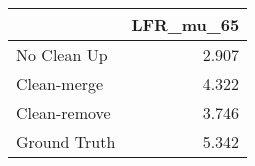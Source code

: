 \begin{tabular}{lr}
\toprule
{} & LFR_mu_65 \\
\midrule
No Clean Up  &     2.907 \\
Clean-merge  &     4.322 \\
Clean-remove &     3.746 \\
Ground Truth &     5.342 \\
\bottomrule
\end{tabular}
